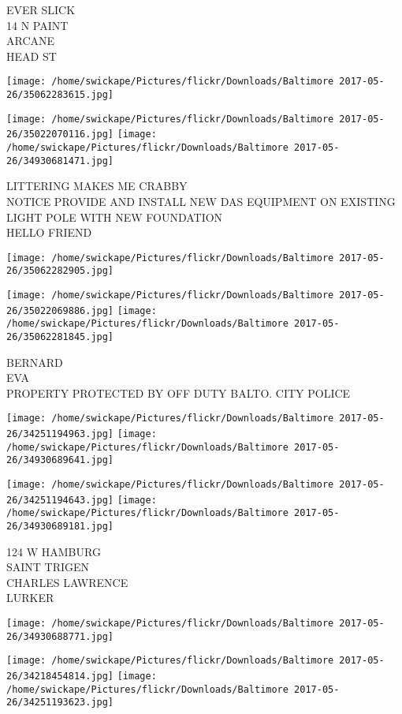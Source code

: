 \documentclass[10pt,letterpaper]{article}
\begin{document}
EVER SLICK\\
14 N PAINT\\
ARCANE\\
HEAD ST
\pagebreak

\texttt{[image: /home/swickape/Pictures/flickr/Downloads/Baltimore 2017-05-26/35062283615.jpg]}

\vspace{0.25in}
\texttt{[image: /home/swickape/Pictures/flickr/Downloads/Baltimore 2017-05-26/35022070116.jpg]}
\texttt{[image: /home/swickape/Pictures/flickr/Downloads/Baltimore 2017-05-26/34930681471.jpg]}

LITTERING MAKES ME CRABBY\\
NOTICE PROVIDE AND INSTALL NEW DAS EQUIPMENT ON EXISTING LIGHT POLE WITH NEW FOUNDATION\\
HELLO FRIEND
\pagebreak

\texttt{[image: /home/swickape/Pictures/flickr/Downloads/Baltimore 2017-05-26/35062282905.jpg]}

\vspace{0.25in}
\texttt{[image: /home/swickape/Pictures/flickr/Downloads/Baltimore 2017-05-26/35022069886.jpg]}
\texttt{[image: /home/swickape/Pictures/flickr/Downloads/Baltimore 2017-05-26/35062281845.jpg]}

BERNARD\\
EVA\\
PROPERTY PROTECTED BY OFF DUTY BALTO. CITY POLICE
\pagebreak

\texttt{[image: /home/swickape/Pictures/flickr/Downloads/Baltimore 2017-05-26/34251194963.jpg]}
\texttt{[image: /home/swickape/Pictures/flickr/Downloads/Baltimore 2017-05-26/34930689641.jpg]}

\texttt{[image: /home/swickape/Pictures/flickr/Downloads/Baltimore 2017-05-26/34251194643.jpg]}
\texttt{[image: /home/swickape/Pictures/flickr/Downloads/Baltimore 2017-05-26/34930689181.jpg]}

124 W HAMBURG\\
SAINT TRIGEN\\
CHARLES LAWRENCE\\
LURKER
\pagebreak

\texttt{[image: /home/swickape/Pictures/flickr/Downloads/Baltimore 2017-05-26/34930688771.jpg]}

\vspace{0.25in}
\texttt{[image: /home/swickape/Pictures/flickr/Downloads/Baltimore 2017-05-26/34218454814.jpg]}
\texttt{[image: /home/swickape/Pictures/flickr/Downloads/Baltimore 2017-05-26/34251193623.jpg]}
\end{document}
